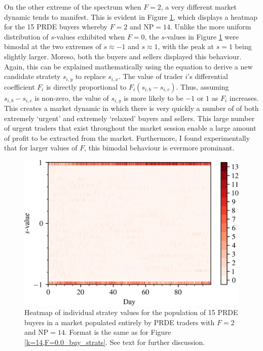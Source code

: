 \documentclass[conference]{IEEEtran}
\begin{document}
On the other extreme of the spectrum when $F=2$, a very different market dynamic tends to manifest.
This is evident in Figure \ref{k=14,F=2.0_buy_strats}, which displays a heatmap for the 15 PRDE buyers whereby $F=2$ and $\mathrm{NP}=14$.
Unlike the more uniform distribution of $s$-values exhibited when $F=0$, the $s$-values in Figure \ref{k=14,F=2.0_buy_strats} were bimodal at the two extremes of $s\approx-1$ and $s\approx1$, with the peak at $s=1$ being slightly larger.
Moreso, both the buyers and sellers displayed this behaviour.
Again, this can be explained mathematically using the equation to derive a new candidate stratety $s_{i,y}$ to replace $s_{i,x}$.
The value of trader $i$'s differential coefficient $F_i$ is directly proportional to $F_i(s_{i,b}-s_{i,c})$.
Thus, assuming $s_{i,b}-s_{i,c}$ is non-zero, the value of $s_{i,y}$ is more likely to be $-1$ or $1$ as $F_i$ increases.
This creates a market dynamic in which there is very quickly a number of of both extremely `urgent' and extremely `relaxed' buyers and sellers.
This large number of urgent traders that exist throughout the market session enable a large amount of profit to be extracted from the market.
Furthermore, I found experimentally that for larger values of $F$, this bimodal behaviour is evermore prominant.

\begin{figure}[htbp]
    \centerline{\includegraphics[width=\columnwidth]{k=14,F=2.0_buy_strats.png}}
    \caption{
        Heatmap of individual stratey values for the population of 15 PRDE buyers in a market populated entirely by PRDE traders with $F=2$ and $\mathrm{NP}=14$.
        Format is the same as for Figure \ref{k=14,F=0.0_buy_strats}.
        See text for further discussion.
    }
    \label{k=14,F=2.0_buy_strats}
\end{figure}
\end{document}
